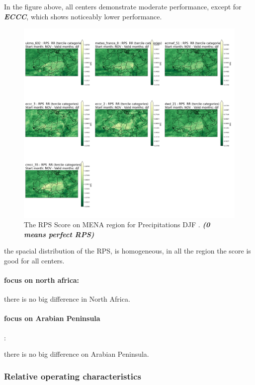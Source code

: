 In the figure above, all centers demonstrate moderate performance, except for \textbf{\textit{ECCC}}, which shows noticeably lower performance. 


\begin{figure}[H]
    \centering
    \includegraphics[scale=0.25]{plots/prob/rps/rps_djf_RR.png}
    \caption{The   RPS Score on MENA region for Precipitations DJF . \textbf{\textit{(0 means perfect RPS)}}}
\end{figure}

the spacial distribution of the RPS, is homogeneous, in all the region the score is good for all centers.

\paragraph{focus on north africa:}

there is no big difference in North Africa.

\paragraph{focus on Arabian Peninsula}:

there is no big difference on Arabian Peninsula.


\subsubsection{Relative operating characteristics}

